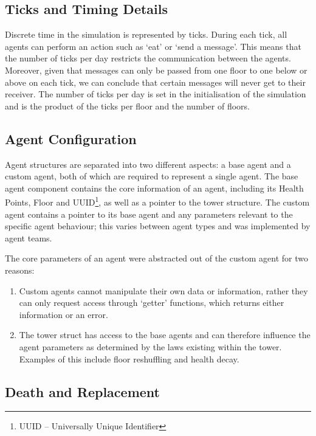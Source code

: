 \subsection{Ticks and Timing Details}

Discrete time in the simulation is represented by ticks. During each tick, all agents can perform an action such as `eat' or `send a message'. This means that the number of ticks per day restricts the communication between the agents. Moreover, given that messages can only be passed from one floor to one below or above on each tick, we can conclude that certain messages will never get to their receiver. The number of ticks per day is set in the initialisation of the simulation and is the product of the ticks per floor and the number of floors.

\subsection{Agent Configuration}

Agent structures are separated into two different aspects: a base agent and a custom agent, both of which are required to represent a single agent.
The base agent component contains the core information of an agent, including its Health Points, Floor and UUID\footnote{UUID -- Universally Unique Identifier}, as well as a pointer to the tower structure. 
The custom agent contains a pointer to its base agent and any parameters relevant to the specific agent behaviour; this varies between agent types and was implemented by agent teams.

The core parameters of an agent were abstracted out of the custom agent for two reasons:
\begin{enumerate}
    \item Custom agents cannot manipulate their own data or information, rather they can only request access through `getter' functions, which returns either information or an error.
    \item The tower struct has access to the base agents and can therefore influence the agent parameters as determined by the laws existing within the tower. Examples of this include floor reshuffling and health decay.
\end{enumerate}

\subsection{Death and Replacement}

